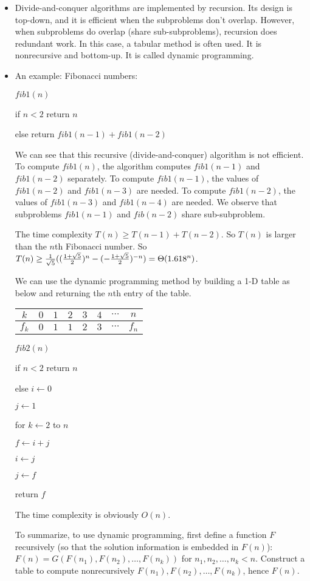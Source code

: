 \documentclass{article}
\begin{document}
\begin{itemize}

\item Divide-and-conquer algorithms are implemented by recursion. Its
design is top-down, and it is efficient when the subproblems
don't overlap. However, when subproblems do overlap (share
sub-subproblems), recursion does redundant work. In this case,
a tabular method is often used. It is nonrecursive and bottom-up. 
It is called dynamic programming.

\item An example: Fibonacci numbers:

$fib1(n)$

\qquad if $n<2$ return $n$

\qquad else return $fib1(n-1)+fib1(n-2)$

We can see that this recursive (divide-and-conquer) algorithm is
not efficient. To compute $fib1(n)$, the algorithm computes
$fib1(n-1)$ and $fib1(n-2)$ separately. To compute $fib1(n-1)$,
the values of $fib1(n-2)$ and $fib1(n-3)$ are needed. To compute
$fib1(n-2)$, the values of $fib1(n-3)$ and $fib1(n-4)$ are needed.
We observe that subproblems $fib1(n-1)$ and $fib(n-2)$ share
sub-subproblem. 

The time complexity $T(n)\ge T(n-1)+T(n-2)$. So $T(n)$ is larger than
the $n$th Fibonacci number. So $T(n)\ge {1\over\sqrt5}
(({1+\sqrt5\over2})^n-(-{1+\sqrt5\over2})^{-n})=\Theta({1.618}^n)$.

We can use the dynamic programming method by building a
1-D table as below and returning the $n$th entry of the table.

\begin{center}
\begin{tabular}{c|ccccccc}
$k$ & $0$ & $1$ & $2$ & $3$ & $4$ & $\cdots$ & $n$\\\hline
$f_k$ & $0$ & $1$ & $1$ & $2$ & $3$ & $\cdots$ & $f_n$\\
\end{tabular}
\end{center}

$fib2(n)$

\qquad if $n<2$ return $n$

\qquad else $i\leftarrow 0$

\qquad\qquad $j\leftarrow 1$

\qquad\qquad for $k\leftarrow 2$ to $n$ 

\qquad\qquad\qquad $f\leftarrow i+j$

\qquad\qquad\qquad $i\leftarrow j$

\qquad\qquad\qquad $j\leftarrow f$

\qquad\qquad return $f$

The time complexity is obviously $O(n)$.

To summarize, to use dynamic programming, first define
a function $F$ recursively (so that the solution information
is embedded in $F(n)$): $F(n)=G(F(n_1), F(n_2), \ldots, F(n_k))$
for $n_1,n_2,\ldots,n_k<n$. Construct a table to compute nonrecursively
$F(n_1), F(n_2),\ldots,F(n_k)$, hence $F(n)$.

\end{itemize}
\end{document}
